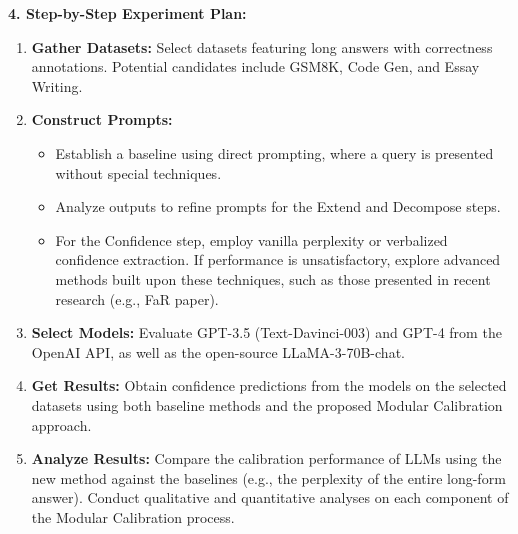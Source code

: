 \begin{tcolorbox}[colback=blue!5!white,colframe=blue!75!black,title=\textbf{Modular Calibration for Long-form Answers (Part 1)}]
    \textbf{4. Step-by-Step Experiment Plan:}
    \begin{enumerate}
        \item \textbf{Gather Datasets:} Select datasets featuring long answers with correctness annotations. Potential candidates include GSM8K, Code Gen, and Essay Writing.
        \item \textbf{Construct Prompts:}
        \begin{itemize}
            \item[(a)] Establish a baseline using direct prompting, where a query is presented without special techniques.
            \item[(b)] Analyze outputs to refine prompts for the Extend and Decompose steps.
            \item[(c)] For the Confidence step, employ vanilla perplexity or verbalized confidence extraction. If performance is unsatisfactory, explore advanced methods built upon these techniques, such as those presented in recent research (e.g., FaR paper).
        \end{itemize}
        \item \textbf{Select Models:} Evaluate GPT-3.5 (Text-Davinci-003) and GPT-4 from the OpenAI API, as well as the open-source LLaMA-3-70B-chat.
        \item \textbf{Get Results:} Obtain confidence predictions from the models on the selected datasets using both baseline methods and the proposed Modular Calibration approach.
        \item \textbf{Analyze Results:} Compare the calibration performance of LLMs using the new method against the baselines (e.g., the perplexity of the entire long-form answer). Conduct qualitative and quantitative analyses on each component of the Modular Calibration process.
    \end{enumerate}
    
\end{tcolorbox}

\newpage 


